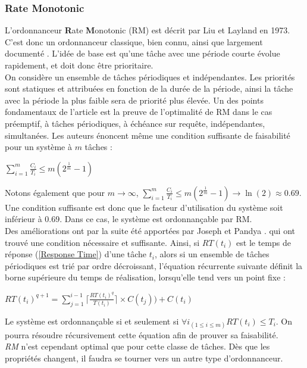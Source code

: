 \documentclass[11pt,a4paper,oneside]{report}
\begin{document}
\subsubsection{Rate Monotonic}
L'ordonnanceur \textbf{R}ate \textbf{M}onotonic (RM) est décrit par Liu et Layland \cite{liu_scheduling_1973} en 1973. C'est 
donc un ordonnanceur classique, bien connu, ainsi que largement documenté \cite{kermia_ordonnancement_2009}. 
L'idée de base est qu'une tâche avec une période courte évolue rapidement, et 
doit donc être prioritaire.\\
On considère un ensemble de tâches périodiques et indépendantes.
Les priorités sont statiques et attribuées en fonction de la durée de la période, ainsi 
la tâche avec la période la plus faible sera de priorité plus élevée. 
Un des points fondamentaux de l'article est la preuve de l'optimalité de RM dans le cas 
préemptif, à tâches périodiques, à échéance sur requête, indépendantes, simultanées.
Les auteurs énoncent même une condition suffisante de faisabilité pour un système à $m$ tâches : \\
\begin{center}
	$\sum_{i=1}^{m}\frac{C_i}{T_i} \leq m(2^{\frac{1}{m}}-1)$
\end{center}
Notons également que pour $m \rightarrow \infty$, $\sum_{i=1}^{m}\frac{C_i}{T_i} \leq m(2^{\frac{1}{m}}-1) \rightarrow \ln(2) \approx 0.69$.
Une condition suffisante est donc que le facteur d'utilisation du système soit inférieur à 0.69. 
Dans ce cas, le système est ordonnançable par RM.\\

Des améliorations ont par la suite été apportées par Joseph et Pandya \cite{joseph_finding_1986}.
qui ont trouvé une condition nécessaire et suffisante. 
Ainsi, si $RT(t_i)$ est le temps de réponse (\ref{Response Time}) d'une tâche $t_i$, 
alors si un ensemble de tâches périodiques est trié par ordre décroissant, l'équation 
récurrente suivante 
définit la borne supérieure du temps de réalisation, lorsqu'elle tend vers un point fixe :
\begin{center}
	$RT(t_i)^{q+1} = \sum_{j=1}^{i-1} \lceil \frac{RT(t_i)^q}{T(t_i)} \rceil \times C(t_j)) + C(t_i)$
\end{center}
Le système est ordonnançable si et seulement si $\forall i_{(1 \leq i \leq m)}RT(t_i) \leq T_i$.
On pourra résoudre récursivement cette équation afin de prouver sa faisabilité.\\

\textit{RM} n'est cependant optimal que pour cette classe de tâches. Dès que les propriétés changent, 
il faudra se tourner vers un autre type d'ordonnanceur.
\end{document}
